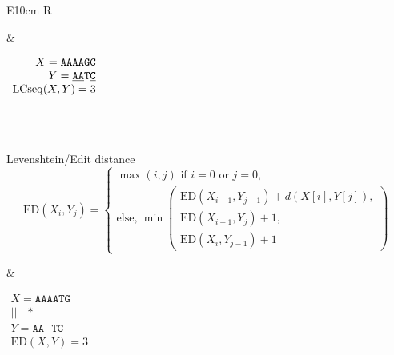 \begin{table}
{\begin{tabularx}{\textwidth}{E{10cm}   R}
\begin{minipage}{10cm}
            \vspace{0.4cm}
        \end{minipage}
        &
        \hfill
        \begin{minipage}{4cm} \renewcommand{\arraystretch}{1}
            \hfill
            $\begin{array}{r}
                X= \mathrm{\texttt{AAAAGC}}\\
                Y= \mathrm{\texttt{\underline{AA}T\underline{C}}}\\
                \mathrm{LCseq}(X,Y)=3
            \end{array}$
        \end{minipage}\\
        \hline \\
        \begin{minipage}{10cm} \renewcommand{\arraystretch}{1}
            Levenshtein/Edit distance \\
            $$ \mathrm{ED}(X_i,Y_j)= \left\{
                \begin{array}{l}
                    \max(i,j) \mbox{ if } i=0 \mbox{ or } j=0 {,} \\
                    \mbox{else, } \min 
                    \begin{pmatrix}
                        \mathrm{ED}(X_{i-1},Y_{j-1})+d(X[i],Y[j]), \\
                        \mathrm{ED}(X_{i-1},Y_j)+1, \\
                        \mathrm{ED}(X_i,Y_{j-1})+1
                    \end{pmatrix} 
                \end{array} \right. $$
                \vspace{0.4cm}
            \end{minipage}
            &
            \hfill
            \begin{minipage}{4cm} \renewcommand{\arraystretch}{1}
                \hfill
                $\begin{array}{r}
                    X= \mathrm{\texttt{AAAATG}}\\
                    \mathrm{\texttt{||~~|*}}\\
                    Y= \mathrm{\texttt{AA-{-}TC}}\\
                    \mathrm{ED}(X,Y)=3
                \end{array}$
        \end{minipage}\\

\end{tabularx}}
\end{table}
